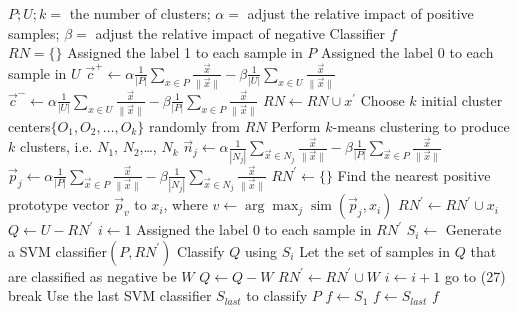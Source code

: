 \documentclass{article}
\begin{document}
\begin{algorithm}[!h]
\renewcommand{\algorithmicrequire}{\textbf{Input:}} %
\renewcommand{\algorithmicensure}{\textbf{Output:}} %
	\caption{Roc-Clu-SVM} %
	\begin{algorithmic}[1] %
	    \REQUIRE
	    $P;U;k=$ the number of clusters; $\alpha=$ adjust the relative impact of positive samples; $\beta=$ adjust the relative impact of negative
	    \ENSURE
	    Classifier $f$ \\
	    \STATE $RN=\{\}$
	    \STATE Assigned the label 1 to each sample in $P$
		\STATE Assigned the label 0 to each sample in $U$
	    \STATE $\vec{c}^{+}\leftarrow \alpha \frac{1}{|P|} \sum_{x \in P} \frac{\vec{x}}{\|\vec{x}\|}-\beta \frac{1}{|U|} \sum_{x \in U} \frac{\vec{x}}{\|\vec{x}\|}$
	    \STATE $\vec{c}^{-}\leftarrow \alpha \frac{1}{|U|} \sum_{x \in U} \frac{\vec{x}}{\|\vec{x}\|}-\beta \frac{1}{|P|} \sum_{x \in P} \frac{\vec{x}}{\|\vec{x}\|}$
	    \STATE $RN\leftarrow RN\cup x^{'}$
	    \ENDIF
	    \ENDFOR
	    \STATE Choose $k$ initial cluster centers$\{O_1, O_2, \dots , O_k\}$ randomly from $RN$
	    \STATE Perform $k$-means clustering to produce $k$ clusters, i.e. $N_1$, $N_2$,\dots, $N_k$
	    \STATE $\vec{n}_{j}\leftarrow \alpha \frac{1}{\left|N_{j}\right|} \sum_{\vec{x} \in N_{j}} \frac{\vec{x}}{\|\vec{x}\|}-\beta \frac{1}{|P|} \sum_{\vec{x} \in P} \frac{\vec{x}}{\|\vec{x}\|}$
	    \STATE $\vec{p}_{j}\leftarrow \alpha \frac{1}{\left|P\right|} \sum_{\vec{x} \in P} \frac{\vec{x}}{\|\vec{x}\|}-\beta \frac{1}{|N_{j}|} \sum_{\vec{x} \in N_{j}} \frac{\vec{x}}{\|\vec{x}\|}$
	    \ENDFOR
	    \STATE $RN^{'}\leftarrow \{\}$
	    \STATE Find the nearest positive prototype vector $\vec{p}_v$ to $x_i$, where $v\leftarrow \arg \max_{j} \operatorname{sim}\left(\vec{p}_{j}, x_{i}\right)$
	    \STATE $RN^{'}\leftarrow RN^{'}\cup x_i$
	    \ENDIF
	    \ENDFOR
	    \STATE $Q\leftarrow U-RN^{'}$
	    \STATE $i\leftarrow 1$
	    \STATE Assigned the label 0 to each sample in $RN^{'}$
	    \STATE $S_i\leftarrow$ Generate a SVM classifier$(P,RN^{'})$
	    \STATE Classify $Q$ using $S_i$
	    \STATE Let the set of samples in $Q$ that are classified as negative be $W$
	    \STATE $Q\leftarrow Q-W$
	    \STATE $RN^{'}\leftarrow RN^{'}\cup W$
	    \STATE $i\leftarrow i+1$
	    \STATE go to (27)
	    \ELSE
	    \STATE break
	    \ENDIF
	    \STATE Use the last SVM classifier $S_{last}$ to classify $P$
	    \STATE $f\leftarrow S_1$
	    \ELSE
	    \STATE $f\leftarrow S_{last}$
	    \ENDIF
	    \RETURN $f$
	\end{algorithmic}
\end{algorithm}
\end{document}
